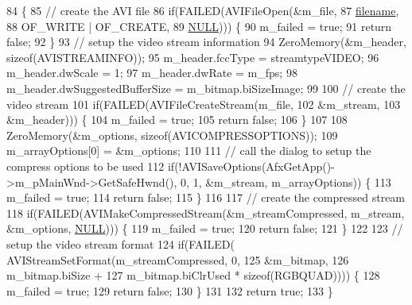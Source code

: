 \begin{DoxyCode}
84 \{
85   \textcolor{comment}{// create the AVI file}
86   \textcolor{keywordflow}{if}(FAILED(AVIFileOpen(&m\_file,
87                         \mbox{\hyperlink{_s_d_l_8cpp_ac33a174c39700095ca0f892624d85a3f}{filename}},
88                         OF\_WRITE | OF\_CREATE,
89                         \mbox{\hyperlink{getopt1_8c_a070d2ce7b6bb7e5c05602aa8c308d0c4}{NULL}}))) \{
90     m\_failed = \textcolor{keyword}{true};
91     \textcolor{keywordflow}{return} \textcolor{keyword}{false};
92   \}
93   \textcolor{comment}{// setup the video stream information}
94   ZeroMemory(&m\_header, \textcolor{keyword}{sizeof}(AVISTREAMINFO));
95   m\_header.fccType = streamtypeVIDEO;
96   m\_header.dwScale = 1;
97   m\_header.dwRate = m\_fps;
98   m\_header.dwSuggestedBufferSize  = m\_bitmap.biSizeImage;
99 
100   \textcolor{comment}{// create the video stream}
101   \textcolor{keywordflow}{if}(FAILED(AVIFileCreateStream(m\_file,
102                                 &m\_stream,
103                                 &m\_header))) \{
104     m\_failed = \textcolor{keyword}{true};
105     \textcolor{keywordflow}{return} \textcolor{keyword}{false};
106   \}
107       
108   ZeroMemory(&m\_options, \textcolor{keyword}{sizeof}(AVICOMPRESSOPTIONS));
109   m\_arrayOptions[0] = &m\_options;
110 
111   \textcolor{comment}{// call the dialog to setup the compress options to be used}
112   \textcolor{keywordflow}{if}(!AVISaveOptions(AfxGetApp()->m\_pMainWnd->GetSafeHwnd(), 0, 1, &m\_stream, m\_arrayOptions)) \{
113     m\_failed = \textcolor{keyword}{true};
114     \textcolor{keywordflow}{return} \textcolor{keyword}{false};
115   \}
116   
117   \textcolor{comment}{// create the compressed stream}
118   \textcolor{keywordflow}{if}(FAILED(AVIMakeCompressedStream(&m\_streamCompressed, m\_stream, &m\_options, 
      \mbox{\hyperlink{getopt1_8c_a070d2ce7b6bb7e5c05602aa8c308d0c4}{NULL}}))) \{
119     m\_failed = \textcolor{keyword}{true};
120     \textcolor{keywordflow}{return} \textcolor{keyword}{false};
121   \}
122   
123   \textcolor{comment}{// setup the video stream format}
124   \textcolor{keywordflow}{if}(FAILED( AVIStreamSetFormat(m\_streamCompressed, 0,
125                                 &m\_bitmap,
126                                 m\_bitmap.biSize +
127                                 m\_bitmap.biClrUsed * \textcolor{keyword}{sizeof}(RGBQUAD)))) \{
128     m\_failed = \textcolor{keyword}{true};
129     \textcolor{keywordflow}{return} \textcolor{keyword}{false};
130   \}
131 
132   \textcolor{keywordflow}{return} \textcolor{keyword}{true};
133 \}
\end{DoxyCode}
